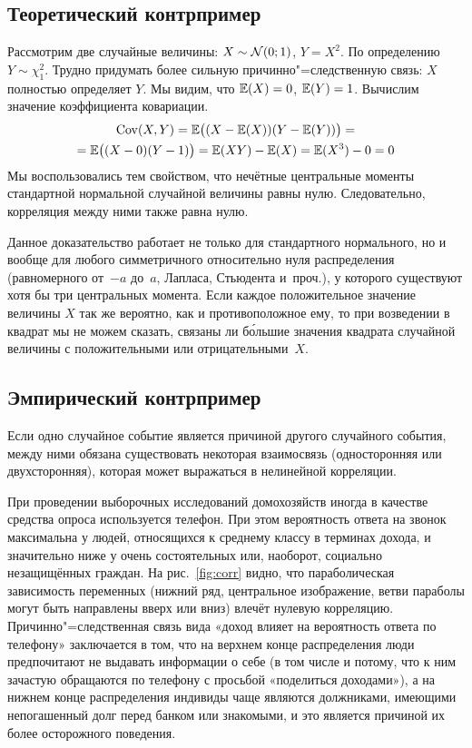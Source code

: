 \documentclass[final,pdftex]{../../template/epsilonj}
\begin{document}
\subsection{Теоретический контрпример}

Рассмотрим две случайные величины: $X\sim\mathcal{N}(0;1)$, $Y=X^2$. По определению $Y\sim \chi^2_1$. Трудно придумать более сильную причинно"=следственную связь: $X$ полностью определяет $Y$. Мы видим, что $\mathbb{E}(X)=0$, $\mathbb{E}(Y)=1$. Вычислим значение коэффициента ковариации. 
\begin{multline*}
\cov(X,Y) = \E\bigl( (X - \E(X)) (Y - \E(Y)) \bigr) = \\
 = \E\bigl( (X-0)(Y-1) \bigr) = \E(XY) - \E(X) = \E(X^3) - 0 = 0
\end{multline*}
Мы воспользовались тем свойством, что нечётные центральные моменты стандартной нормальной случайной величины равны нулю. Следовательно, корреляция между ними также равна нулю.

Данное доказательство работает не только для стандартного нормального, но и вообще для любого симметричного относительно нуля распределения (равномерного от~$-a$ до~$a$, Лапласа, Стьюдента и~проч.), у которого существуют хотя бы три центральных момента. Если каждое положительное значение величины $X$ так же вероятно, как и противоположное ему, то при возведении в квадрат мы не можем сказать, связаны ли б\'{о}льшие значения квадрата случайной величины с положительными или отрицательными~$X$. 

\subsection{Эмпирический контрпример}

Если одно случайное событие является причиной другого случайного события, между ними обязана существовать некоторая взаимосвязь (односторонняя или двухсторонняя), которая может выражаться в нелинейной корреляции.

При проведении выборочных исследований домохозяйств иногда в качестве средства опроса используется телефон. При этом вероятность ответа на звонок максимальна у людей, относящихся к среднему классу в терминах дохода, и значительно ниже у очень состоятельных или, наоборот, социально незащищённых граждан. На рис.~\ref{fig:corr} видно, что параболическая зависимость переменных (нижний ряд, центральное изображение, ветви параболы могут быть направлены вверх или вниз) влечёт нулевую корреляцию. Причинно"=следственная связь вида «доход влияет на вероятность ответа по телефону» заключается в том, что на верхнем конце распределения люди предпочитают не выдавать информации о себе (в том числе и потому, что к ним зачастую обращаются по телефону с просьбой «поделиться доходами»), а на нижнем конце распределения индивиды чаще являются должниками, имеющими непогашенный долг перед банком или знакомыми, и это является причиной их более осторожного поведения.
\end{document}
